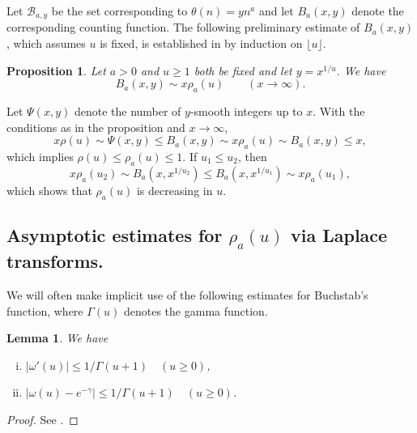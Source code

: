 \documentclass[11pt]{amsart}
\newtheorem{proposition}{Proposition}
\newtheorem{lemma}{Lemma}
\begin{document}
Let $\mathcal{B}_{a,y}$ be the set corresponding to $\theta(n) = y n^{a}$ and let $B_{a}(x,y)$ denote the corresponding counting function.
The following preliminary estimate of $B_a(x,y)$, which assumes $u$ is fixed, is established in \cite[Thm. 2.9]{Sar} by induction on $\lfloor u \rfloor$.

\begin{proposition}
Let $a>0$ and $u\ge 1$ both be fixed and let $y=x^{1/u}$. We have
$$
B_{a}(x,y) \sim  x \rho_a(u) \qquad (x\to \infty).
$$
\end{proposition}

Let $\Psi(x,y)$ denote the number of $y$-smooth integers up to $x$. With the conditions as in the proposition and $x\to \infty$,
$$
x \rho(u) \sim \Psi(x,y) \le B_{a}(x,y) \sim x \rho_a(u) \sim  B_{a}(x,y) \le x,
$$
which implies $\rho(u)\le  \rho_a(u) \le 1$. 
If $u_1\le u_2$, then 
$$
x \rho_a(u_2) \sim  B_{a}(x,x^{1/u_2}) \le B_{a}(x,x^{1/u_1}) \sim x \rho_a(u_1),
$$
which shows that $\rho_a(u)$ is decreasing in $u$.

\subsection{Asymptotic estimates for $\rho_a(u)$ via Laplace transforms.}

We will often make implicit use of the following estimates for Buchstab's function, where $\Gamma(u)$ denotes the gamma function.
\begin{lemma}\label{omegaest}
We have
\begin{enumerate}[(i)]
\item $|\omega'(u)|\le 1/\Gamma(u+1) \quad (u\ge 0)$,
\item $|\omega(u)-e^{-\gamma}| \le 1/\Gamma(u+1) \quad (u\ge 0)$.
\end{enumerate}
\end{lemma}

\begin{proof} See \cite[Lemma 2.1]{PDD}.
\end{proof}
\end{document}
